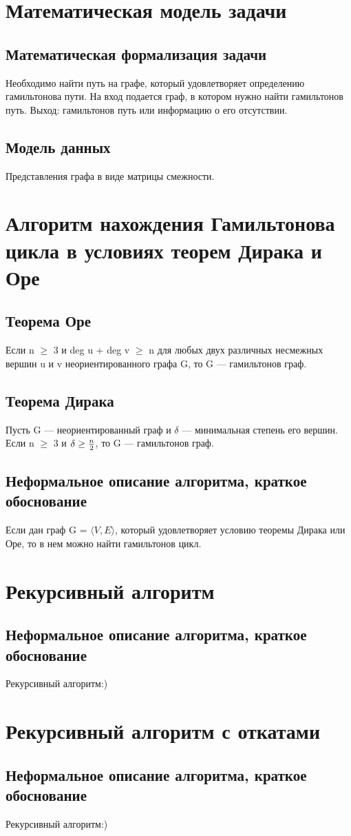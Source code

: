 \section{Математическая модель задачи}

\subsection{Математическая формализация задачи}
Необходимо найти путь на графе, который удовлетворяет определению гамильтонова пути.
На вход подается граф, в котором нужно найти гамильтонов путь.
Выход: гамильтонов путь или информацию о его отсутствии.

\subsection{Модель данных}
Представления графа в виде матрицы смежности.


\section{Алгоритм нахождения Гамильтонова цикла в условиях теорем Дирака и Оре}

\subsection{Теорема Оре}
Если n $\geq$ 3 и deg u + deg v $\geq$ n для любых двух различных несмежных вершин u и v неориентированного графа  G, то  G — гамильтонов граф.

\subsection{Теорема Дирака}
Пусть G — неориентированный граф и $\delta$ — минимальная степень его вершин.
Если n $\geq$ 3 и $\delta\geq{n\over{2}}$, то  G — гамильтонов граф.

\subsection{Неформальное описание алгоритма, краткое обоснование}
Если дан граф G = $\langle {V, E} \rangle$, который удовлетворяет условию теоремы Дирака или Оре,
то в нем можно найти гамильтонов цикл.


\section{Рекурсивный алгоритм}

\subsection{Неформальное описание алгоритма, краткое обоснование}
Рекурсивный алгоритм:)


\section{Рекурсивный алгоритм с откатами}

\subsection{Неформальное описание алгоритма, краткое обоснование}
Рекурсивный алгоритм:)


